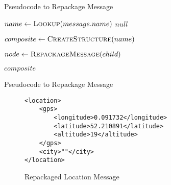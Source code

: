 \documentclass[12pt,twoside,notitlepage]{report}
\begin{document}
\begin{algorithm}
\begin{algorithmic}[1]
		\State {}
	\EndIf
	
	\State {}
	
		\State {}
	\EndIf
\EndFunction 
\end{algorithmic}
\caption{Pseudocode to Repackage Message}
\label{alg:repack_message_overall}
\end{algorithm}

\begin{algorithm}
\begin{algorithmic}[1]
	 \label{alg:line:lookup_name_start}
		\State $name\gets \Call{Lookup}{message.name}$
	\Else
		\State \Return $null$
	\EndIf \label{alg:line:lookup_name_end}
	
	 \label{alg:line:check_children_start}
		\State \Return {}
	\Else
		\State $composite\gets \Call{CreateStructure}{name}$
	\EndIf \label{alg:line:check_children_end}
		
	 \label{alg:line:repack_children_start}
		\State {}
		
		\State $node \gets \Call{RepackageMessage}{child}$
			\State {}
		\EndIf
	\EndFor \label{alg:line:repack_children_end}
	
	\State {}

	\State \Return $composite$
	
\EndFunction
\end{algorithmic}
\caption{Pseudocode to Repackage Message}
\label{alg:repack_message}
\end{algorithm}

\begin{figure}[tbh]
\begin{lstlisting}
<location>
	<gps>
		<longitude>0.091732</longitude>
		<latitude>52.210891</latitude>
		<altitude>19</altitude>
	</gps>
	<city>""</city>
</location>
\end{lstlisting}
\caption{Repackaged Location Message}
\label{fig:locationmessagerepack}
\end{figure}
\end{document}
